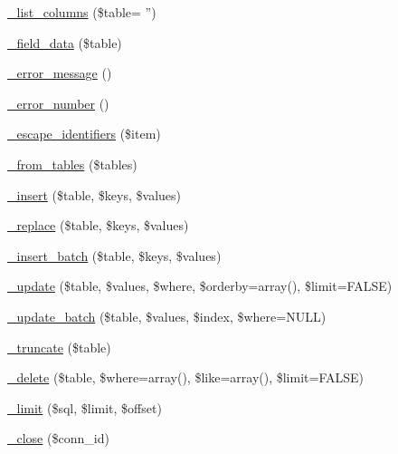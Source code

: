 \begin{DoxyCompactItemize}
\item 
\hyperlink{class_c_i___d_b__mysql__driver_a2a81bb476a5c76fe6f763b0557c1e4c2}{\-\_\-list\-\_\-columns} (\$table= '')
\item 
\hyperlink{class_c_i___d_b__mysql__driver_a95247d9671893adc3444cb184ad32ea1}{\-\_\-field\-\_\-data} (\$table)
\item 
\hyperlink{class_c_i___d_b__mysql__driver_a4ca764fe1d6ad526f770f36b5f332bbb}{\-\_\-error\-\_\-message} ()
\item 
\hyperlink{class_c_i___d_b__mysql__driver_a3e48199b3a946499b7e5fba0cdfa6b86}{\-\_\-error\-\_\-number} ()
\item 
\hyperlink{class_c_i___d_b__mysql__driver_aeabfb3952399caa92a013621a98e3042}{\-\_\-escape\-\_\-identifiers} (\$item)
\item 
\hyperlink{class_c_i___d_b__mysql__driver_a885a8b4372b5c099749cefa73767a744}{\-\_\-from\-\_\-tables} (\$tables)
\item 
\hyperlink{class_c_i___d_b__mysql__driver_a69ee76b136052e0a8f06097fb388e53e}{\-\_\-insert} (\$table, \$keys, \$values)
\item 
\hyperlink{class_c_i___d_b__mysql__driver_ae0adf73984daf2d42ad29b66c484c82b}{\-\_\-replace} (\$table, \$keys, \$values)
\item 
\hyperlink{class_c_i___d_b__mysql__driver_a1978e1358c812587a46e242630365099}{\-\_\-insert\-\_\-batch} (\$table, \$keys, \$values)
\item 
\hyperlink{class_c_i___d_b__mysql__driver_ae869ae2275175c5ffa22816a02099d96}{\-\_\-update} (\$table, \$values, \$where, \$orderby=array(), \$limit=F\-A\-L\-S\-E)
\item 
\hyperlink{class_c_i___d_b__mysql__driver_acdcbd5642090362dfe49120a222670b9}{\-\_\-update\-\_\-batch} (\$table, \$values, \$index, \$where=N\-U\-L\-L)
\item 
\hyperlink{class_c_i___d_b__mysql__driver_aa029600528fc1ce660a23ff4b4667f95}{\-\_\-truncate} (\$table)
\item 
\hyperlink{class_c_i___d_b__mysql__driver_ace3cbc04a520b7811fc956cdb9ae1c19}{\-\_\-delete} (\$table, \$where=array(), \$like=array(), \$limit=F\-A\-L\-S\-E)
\item 
\hyperlink{class_c_i___d_b__mysql__driver_aeeaa5cd68dc6ace010c0b8aae89c2d15}{\-\_\-limit} (\$sql, \$limit, \$offset)
\item 
\hyperlink{class_c_i___d_b__mysql__driver_a557bd6ddde8de1f7814e10b1120efd29}{\-\_\-close} (\$conn\-\_\-id)
\end{DoxyCompactItemize}
